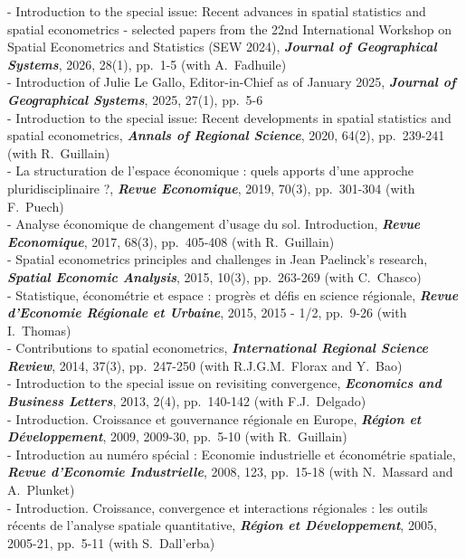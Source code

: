 \documentclass[a4paper,12pt]{article}
\begin{document}
\noindent - Introduction to the special issue: Recent advances in spatial statistics and spatial econometrics - selected papers from the 22nd International Workshop on Spatial Econometrics and Statistics (SEW 2024), \textit{\textbf{Journal of Geographical Systems}}, 2026, 28(1), pp.~1-5 (with A.~Fadhuile) \\ 
- Introduction of Julie Le Gallo, Editor-in-Chief as of January 2025, \textit{\textbf{Journal of Geographical Systems}}, 2025, 27(1), pp.~5-6 \\ 
- Introduction to the special issue: Recent developments in spatial statistics and spatial econometrics, \textit{\textbf{Annals of Regional Science}}, 2020, 64(2), pp.~239-241 (with R.~Guillain) \\ 
- La structuration de l'espace économique : quels apports d'une approche pluridisciplinaire ?, \textit{\textbf{Revue Economique}}, 2019, 70(3), pp.~301-304 (with F.~Puech) \\ 
- Analyse économique de changement d'usage du sol. Introduction, \textit{\textbf{Revue Economique}}, 2017, 68(3), pp.~405-408 (with R.~Guillain) \\ 
- Spatial econometrics principles and challenges in Jean Paelinck's research, \textit{\textbf{Spatial Economic Analysis}}, 2015, 10(3), pp.~263-269 (with C.~Chasco) \\ 
- Statistique, économétrie et espace : progrès et défis en science régionale, \textit{\textbf{Revue d'Economie Régionale et Urbaine}}, 2015, 2015 - 1/2, pp.~9-26 (with I.~Thomas) \\ 
- Contributions to spatial econometrics, \textit{\textbf{International Regional Science Review}}, 2014, 37(3), pp.~247-250 (with R.J.G.M.~Florax and Y.~Bao) \\ 
- Introduction to the special issue on revisiting convergence, \textit{\textbf{Economics and Business Letters}}, 2013, 2(4), pp.~140-142 (with F.J.~Delgado) \\ 
- Introduction. Croissance et gouvernance régionale en Europe, \textit{\textbf{Région et Développement}}, 2009, 2009-30, pp.~5-10 (with R.~Guillain) \\ 
- Introduction au numéro spécial : Economie industrielle et économétrie spatiale, \textit{\textbf{Revue d'Economie Industrielle}}, 2008, 123, pp.~15-18 (with N.~Massard and A.~Plunket) \\
- Introduction. Croissance, convergence et interactions régionales : les outils récents de l'analyse spatiale quantitative, \textit{\textbf{Région et Développement}}, 2005, 2005-21, pp.~5-11 (with S.~Dall'erba) \\
\end{document}

